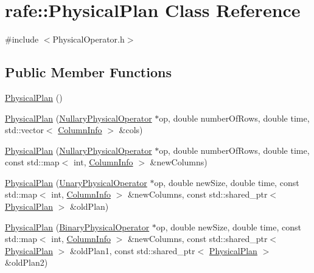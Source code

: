 \hypertarget{classrafe_1_1_physical_plan}{\section{rafe\+:\+:Physical\+Plan Class Reference}
\label{classrafe_1_1_physical_plan}
}


{\ttfamily \#include $<$Physical\+Operator.\+h$>$}

\subsection*{Public Member Functions}
\begin{DoxyCompactItemize}
\item 
\hyperlink{classrafe_1_1_physical_plan_a0084a98932e4918feb1e46c83973c279}{Physical\+Plan} ()
\item 
\hyperlink{classrafe_1_1_physical_plan_a7b1653d5f6e19a477470ccc52139a9ac}{Physical\+Plan} (\hyperlink{classrafe_1_1_nullary_physical_operator}{Nullary\+Physical\+Operator} $\ast$op, double number\+Of\+Rows, double time, std\+::vector$<$ \hyperlink{classrafe_1_1_column_info}{Column\+Info} $>$ \&cols)
\item 
\hyperlink{classrafe_1_1_physical_plan_a869d7b418f71ba491042bfee7283beee}{Physical\+Plan} (\hyperlink{classrafe_1_1_nullary_physical_operator}{Nullary\+Physical\+Operator} $\ast$op, double number\+Of\+Rows, double time, const std\+::map$<$ int, \hyperlink{classrafe_1_1_column_info}{Column\+Info} $>$ \&new\+Columns)
\item 
\hyperlink{classrafe_1_1_physical_plan_aed48c874435c06aa80245eb103cd5242}{Physical\+Plan} (\hyperlink{classrafe_1_1_unary_physical_operator}{Unary\+Physical\+Operator} $\ast$op, double new\+Size, double time, const std\+::map$<$ int, \hyperlink{classrafe_1_1_column_info}{Column\+Info} $>$ \&new\+Columns, const std\+::shared\+\_\+ptr$<$ \hyperlink{classrafe_1_1_physical_plan}{Physical\+Plan} $>$ \&old\+Plan)
\item 
\hyperlink{classrafe_1_1_physical_plan_a2d944eb6010f2c04bc3e6f8cfb0bdd16}{Physical\+Plan} (\hyperlink{classrafe_1_1_binary_physical_operator}{Binary\+Physical\+Operator} $\ast$op, double new\+Size, double time, const std\+::map$<$ int, \hyperlink{classrafe_1_1_column_info}{Column\+Info} $>$ \&new\+Columns, const std\+::shared\+\_\+ptr$<$ \hyperlink{classrafe_1_1_physical_plan}{Physical\+Plan} $>$ \&old\+Plan1, const std\+::shared\+\_\+ptr$<$ \hyperlink{classrafe_1_1_physical_plan}{Physical\+Plan} $>$ \&old\+Plan2)
\end{DoxyCompactItemize}
